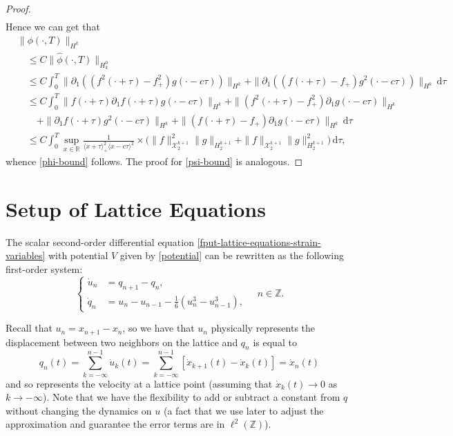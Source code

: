 \documentclass[oneside,reqno]{amsart}
\newcommand{\Z}{\mathbb{Z}}
\newcommand{\R}{\mathbb{R}}
\begin{document}
\begin{proof}
\begin{equation}
\begin{aligned}
		\end{aligned}
	\end{equation}
	Hence we can get that 
	\begin{equation}\label{phi-sobolev-bound}
		\begin{aligned}
			&\|\phi(\cdot, T) \|_{H^k} \\
			&\quad\leq C \| \hat\phi(\cdot, T) \|_{H^0_k} \\
			&\quad\leq C \int_0^T \| \partial_1 ((f^2(\cdot+\tau)-f_+^2)g(\cdot-c\tau)) \|_{H^k} + \| \partial_1( (f(\cdot+\tau)-f_+)g^2(\cdot-c\tau)) \|_{H^k} \, \mathrm d \tau \\
			&\quad\leq C \int_0^T \| f(\cdot+\tau)\partial_1 f(\cdot + \tau)g(\cdot-c\tau) \|_{H^k} + \|(f^2(\cdot+\tau) -f_+^2) \partial_1 g(\cdot - c\tau) \|_{H^k}  \\
			&\qquad + \|\partial_1f(\cdot+\tau) g^2(\cdot - c\tau) \|_{H^k} + \| (f(\cdot + \tau) -f_+) \partial_1 g(\cdot - c\tau) \|_{H^k}\, \mathrm{d}\tau \\ 
			&\quad\leq C \int_0^T \sup_{x\in\R} \frac 1 {\langle x + \tau\rangle_+^2 \langle x - c\tau\rangle^2} \times \Bigg( \|f\|^2_{\mathcal X^{k+1}_{2}} \| g \|_{H^{k+1}_2} + \|f\|_{\mathcal X^{k+1}_{2}} \| g \|^2_{H^{k+1}_2} \Bigg) \, \mathrm d \tau, 
		\end{aligned}
	\end{equation}
	whence \cref{phi-bound} follows. The proof for \cref{psi-bound} is analogous.
\end{proof}

\section{Setup of Lattice Equations}\label{sec:lattice-eqns}

The scalar second-order differential equation \cref{fput-lattice-equations-strain-variables} with potential \(V\) given by \cref{potential} can be rewritten as the following first-order system:
\begin{equation}\label{first-order-lattice-eqns}
	\left\{\begin{aligned}\dot u _n &= q_{n+1} - q_n, \\
		\dot q_n &= u_n - u_{n-1} - \frac{1} 6 ( u_n^3 - u^3_{n-1}),\end{aligned} \right. \quad n \in \Z.
\end{equation}

Recall that \(u_{n} = x_{n+1} - x_n\), so we have that \(u_n\) physically represents the displacement between two neighbors on the lattice and \(q_n\) is equal to 
\begin{equation*}
	q_n(t) = \sum_{k=-\infty}^{n-1} \dot u_k(t) = \sum_{k=-\infty}^{n-1} [\dot x_{k+1}(t) - \dot x_k(t)] = \dot x_n(t)
\end{equation*}
and so represents the velocity at a lattice point (assuming that \(\dot x_k(t) \to 0\) as \(k\to-\infty\)). Note that we have the flexibility to add or subtract a constant from \(q\) without changing the dynamics on \(u\) (a fact that we use later to adjust the approximation and guarantee the error terms are in \(\ell^2(\Z)\)). 
\end{document}
